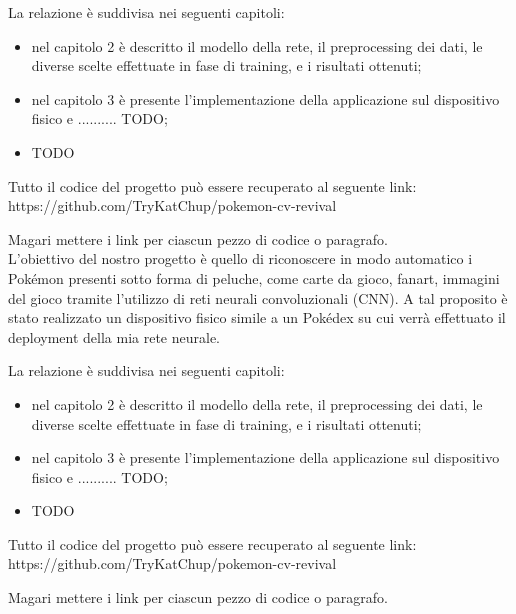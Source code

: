 La relazione è suddivisa nei seguenti capitoli:
\begin{itemize}
  \item nel capitolo 2 è descritto il modello della rete, il preprocessing dei dati, le diverse scelte effettuate in fase di training, e i risultati ottenuti;
  \item nel capitolo 3 è presente l'implementazione della applicazione sul dispositivo fisico e .......... TODO;
  \item TODO
\end{itemize}

Tutto il codice del progetto può essere recuperato al seguente link: 
\\
https://github.com/TryKatChup/pokemon-cv-revival

Magari mettere i link per ciascun pezzo di codice o paragrafo.
\\
L'obiettivo del nostro progetto è quello di riconoscere in modo automatico i Pokémon presenti sotto forma di peluche, come carte da gioco, fanart, immagini del gioco tramite l'utilizzo di reti neurali convoluzionali (CNN). A tal proposito è stato realizzato un dispositivo fisico simile
a un Pokédex su cui verrà effettuato il deployment della mia rete neurale.

La relazione è suddivisa nei seguenti capitoli:
\begin{itemize}
  \item nel capitolo 2 è descritto il modello della rete, il preprocessing dei dati, le diverse scelte effettuate in fase di training, e i risultati ottenuti;
  \item nel capitolo 3 è presente l'implementazione della applicazione sul dispositivo fisico e .......... TODO;
  \item TODO
\end{itemize}

Tutto il codice del progetto può essere recuperato al seguente link: 
\\
https://github.com/TryKatChup/pokemon-cv-revival

Magari mettere i link per ciascun pezzo di codice o paragrafo.
